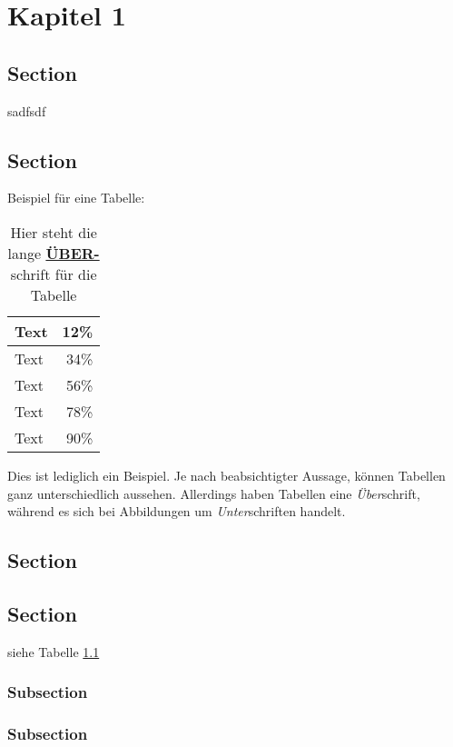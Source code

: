 \chapter{Kapitel 1}

\section{Section}
sadfsdf
\section{Section}
Beispiel für eine Tabelle:
\begin{table}[ht]
	\centering
	\caption[Kurztitel Tabelle]{Hier steht die lange \underline{\textbf{ÜBER-}}schrift für die Tabelle}

		\vspace{1.0em}
		\begin{tabular}{|l|r|}
\hline
Text & 12\% \\
\hline
Text & 34\% \\
\hline
Text & 56\% \\
\hline
Text & 78\% \\
\hline
Text & 90\% \\
\hline
		\end{tabular}
	\label{tab:tabelle}
\end{table}


\noindent{}Dies ist lediglich ein Beispiel. Je nach beabsichtigter Aussage, können Tabellen ganz unterschiedlich aussehen. Allerdings haben Tabellen eine \emph{Über}schrift, während es sich bei Abbildungen um \emph{Unter}schriften handelt.

\section{Section}

\section{Section}
siehe Tabelle \ref{tab:tabelle}

\subsection{Subsection}

\subsection{Subsection}
